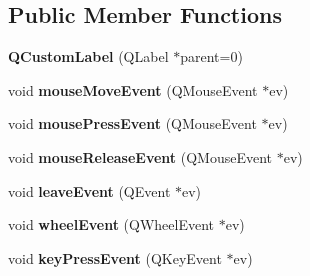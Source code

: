 \subsection*{Public Member Functions}
\begin{DoxyCompactItemize}
\item 
{\bfseries Q\+Custom\+Label} (Q\+Label $\ast$parent=0)\hypertarget{classQCustomLabel_a15eca432ecab522f162c87374ac6bca6}{}\label{classQCustomLabel_a15eca432ecab522f162c87374ac6bca6}

\item 
void {\bfseries mouse\+Move\+Event} (Q\+Mouse\+Event $\ast$ev)\hypertarget{classQCustomLabel_a834a064e119add6ffb0ff1ea5ce78d7e}{}\label{classQCustomLabel_a834a064e119add6ffb0ff1ea5ce78d7e}

\item 
void {\bfseries mouse\+Press\+Event} (Q\+Mouse\+Event $\ast$ev)\hypertarget{classQCustomLabel_a971a01e5c52150d2874555c5d6b11807}{}\label{classQCustomLabel_a971a01e5c52150d2874555c5d6b11807}

\item 
void {\bfseries mouse\+Release\+Event} (Q\+Mouse\+Event $\ast$ev)\hypertarget{classQCustomLabel_ab88c55fd49219104cfabe91ed68aa496}{}\label{classQCustomLabel_ab88c55fd49219104cfabe91ed68aa496}

\item 
void {\bfseries leave\+Event} (Q\+Event $\ast$ev)\hypertarget{classQCustomLabel_a99b5c445f092757d5f1e59c6aee6fb88}{}\label{classQCustomLabel_a99b5c445f092757d5f1e59c6aee6fb88}

\item 
void {\bfseries wheel\+Event} (Q\+Wheel\+Event $\ast$ev)\hypertarget{classQCustomLabel_ae7a4aaaf4f56d95199d1279923d7ff92}{}\label{classQCustomLabel_ae7a4aaaf4f56d95199d1279923d7ff92}

\item 
void {\bfseries key\+Press\+Event} (Q\+Key\+Event $\ast$ev)\hypertarget{classQCustomLabel_a38e4ecf9b9298636b36594cdbace5260}{}\label{classQCustomLabel_a38e4ecf9b9298636b36594cdbace5260}

\end{DoxyCompactItemize}
